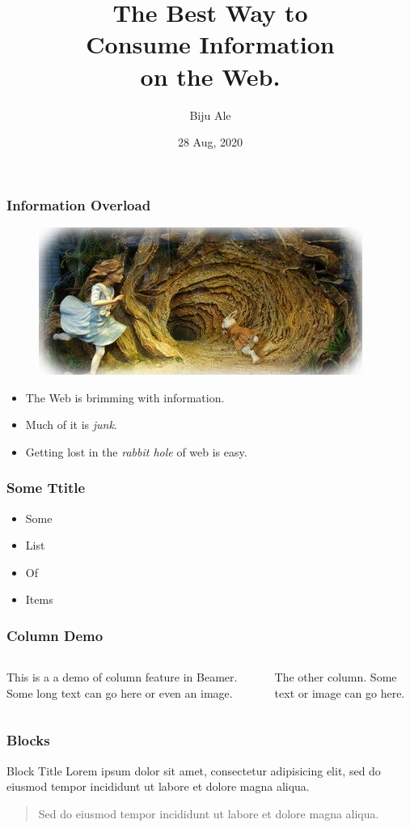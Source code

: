 \documentclass[usenames,dvipsnames]{beamer}
\title{The Best Way to \\{\tiny } Consume Information \\ on the Web.}
\author{Biju Ale}
\institute{bijuale.com.np}
\date{\scriptsize{28 Aug, 2020}}
\begin{document}
{\maketitle}

\begin{frame}
	\frametitle{Information Overload}
		\begin{figure}
			\includegraphics{images/rabbit-hole.png}
		\end{figure}
	\begin{itemize}
		\item The Web is brimming with information.\pause
		\item Much of it is \textit{junk}.
		\item Getting lost in the \textit{rabbit hole }of web is easy.\pause		
	\end{itemize}
\end{frame}

\begin{frame}
\frametitle{Some Ttitle}
\begin{itemize}
	\item Some
	\item List
	\item Of
	\item Items
\end{itemize}
\end{frame}

\begin{frame}
	\frametitle{Column Demo}
	\begin{columns}		
		\begin{column}{.5\textwidth}
			This is a a demo of column feature in Beamer. Some long text can go here or even an image.
		\end{column}			
		\begin{column}{.5\textwidth}
			The other column. Some text or image can go here.
		\end{column}
	\end{columns}
\end{frame}

\begin{frame}
	\frametitle{Blocks}
	\begin{block}{Block Title}
		Lorem ipsum dolor sit amet, consectetur adipisicing elit, 
		sed do eiusmod tempor incididunt ut labore et 
		dolore magna aliqua.
	\end{block}

	\begin{quote}
		Sed do eiusmod tempor incididunt ut labore et dolore magna aliqua.	
	\end{quote}
\end{frame}
\end{document}
